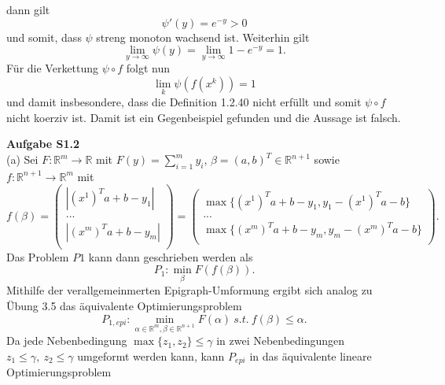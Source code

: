 \documentclass[ngerman, a4paper,12pt]{article}
\begin{document}
dann gilt
\begin{equation*}
\psi ' (y) = e^{-y} > 0
\end{equation*}
und somit, dass $\psi$ streng monoton wachsend ist. Weiterhin gilt 
\begin{equation*}
\lim_{y \rightarrow \infty} \psi(y) = \lim_{y \rightarrow \infty} 1-e^{-y} = 1.
\end{equation*}
Für die Verkettung $\psi \circ f$ folgt nun
\begin{equation*}
\lim\limits_{k} \psi(f(x^k)) = 1
\end{equation*}
und damit insbesondere, dass die Definition 1.2.40 nicht erfüllt und somit $\psi \circ f$ nicht koerziv ist. Damit ist ein Gegenbeispiel gefunden und die Aussage ist falsch. \par
\textbf{Aufgabe S1.2} \\
(a) Sei $F: \mathbb{R}^m \rightarrow \mathbb{R}$ mit $F(y) = \sum_{i=1}^{m}y_i$, $\beta = (a, b)^T \in \mathbb{R}^{n+1}$ sowie $f: \mathbb{R}^{n+1} \rightarrow \mathbb{R}^m$ mit 
\begin{equation*}
	f(\beta) = 
					\begin{pmatrix}
					\left| (x^1)^Ta + b - y_1 \right| \\
					... \\
					\left| (x^m)^Ta + b - y_m \right| \\
					 \end{pmatrix} =
											 \begin{pmatrix}
											 \max\{(x^1)^Ta + b - y_1 , y_1 - (x^1)^Ta - b\} \\
											 ... \\
											 \max\{(x^m)^Ta + b - y_m , y_m - (x^m)^Ta - b\} \\
											 \end{pmatrix}.
\end{equation*}
Das Problem $P1$ kann dann geschrieben werden als
\begin{equation*}
	P_1: \min_{\beta} F(f(\beta)).
\end{equation*}
Mithilfe der verallgemeinmerten Epigraph-Umformung ergibt sich analog zu Übung 3.5 das äquivalente Optimierungsproblem
\begin{equation*}
	P_{1, epi}:\min_{\alpha \in \mathbb{R}^m, \beta \in \mathbb{R}^{n+1}} F(\alpha) \ s.t. \ f(\beta) \leq \alpha.
\end{equation*}
Da jede Nebenbedingung $\max\{z_1, z_2\} \leq \gamma$ in zwei Nebenbedingungen $z_1 \leq \gamma, \ z_2 \leq \gamma$ umgeformt werden kann, kann $P_{epi}$ in das äquivalente lineare Optimierungsproblem 
\end{document}
